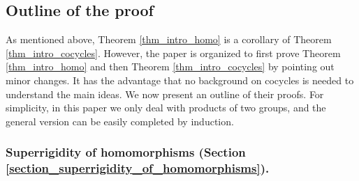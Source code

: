 \documentclass{amsart}
\numberwithin{equation}{section}
\newtheorem{theorem}{Theorem}
\newtheorem{corollary}[theorem]{Corollary}
\theoremstyle{definition}
\begin{document}
    


\subsection{Outline of the proof}
As mentioned above, Theorem \ref{thm_intro_homo} is a corollary of Theorem \ref{thm_intro_cocycles}. However, the paper is organized to first prove Theorem \ref{thm_intro_homo} and then Theorem \ref{thm_intro_cocycles} by pointing out minor changes. It has the advantage that no background on cocycles is needed to understand the main ideas. We now present an outline of their proofs. For simplicity, in this paper we only deal with products of two groups, and the general version can be easily completed by induction.


\subsubsection{Superrigidity of homomorphisms (Section \ref{section_superrigidity_of_homomorphisms}).}
\end{document}
